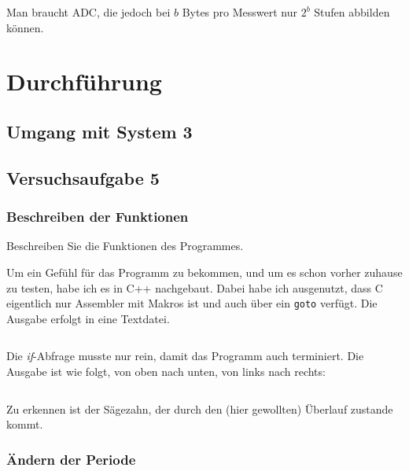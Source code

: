 Man braucht ADC, die jedoch bei $b$ Bytes pro Messwert nur $2^b$ Stufen
abbilden können.


\section{Durchführung}

\subsection{Umgang mit System 3}

\subsection{Versuchsaufgabe 5}

\subsubsection{Beschreiben der Funktionen}

\begin{problem}
	Beschreiben Sie die Funktionen des Programmes.
\end{problem}

Um ein Gefühl für das Programm zu bekommen, und um es schon vorher zuhause zu
testen, habe ich es in C++ nachgebaut. Dabei habe ich ausgenutzt, dass C
eigentlich nur Assembler mit Makros ist und auch über ein \texttt{goto}
verfügt. Die Ausgabe erfolgt in eine Textdatei.

\inputminted[fontsize=\small, linenos]{cpp}{../Prototypen/saegezahn.cpp}

Die \textit{if}-Abfrage musste nur rein, damit das Programm auch terminiert.
Die Ausgabe ist wie folgt, von oben nach unten, von links nach rechts:

\begin{multicols}{9}
	\inputminted[fontsize=\footnotesize]{text}{saegezahn.txt}
\end{multicols}

Zu erkennen ist der Sägezahn, der durch den (hier gewollten) Überlauf zustande
kommt.

\subsubsection{Ändern der Periode}

